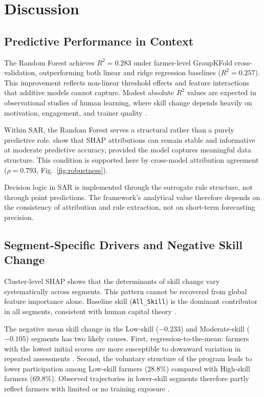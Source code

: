 \documentclass[3p,twocolumn,authoryear]{elsarticle}
\begin{document}
\section{Discussion}

\subsection{Predictive Performance in Context}

The Random Forest achieves $R^{2} = 0.283$ under farmer-level GroupKFold
cross-validation, outperforming both linear and ridge regression baselines
($R^{2} = 0.257$).
This improvement reflects non-linear threshold effects and feature
interactions that additive models cannot capture.
Modest absolute $R^{2}$ values are expected in observational studies of
human learning, where skill change depends heavily on motivation,
engagement, and trainer quality \citep{davis2012}.

Within SAR, the Random Forest serves a structural rather than a purely
predictive role.
\citet{lundberg2020} show that SHAP attributions can remain stable and
informative at moderate predictive accuracy, provided the model captures
meaningful data structure.
This condition is supported here by cross-model attribution agreement
($\rho = 0.793$, Fig.~\ref{fig:robustness}).

Decision logic in SAR is implemented through the surrogate rule structure,
not through point predictions.
The framework's analytical value therefore depends on the consistency of
attribution and rule extraction, not on short-term forecasting precision.

\subsection{Segment-Specific Drivers and Negative Skill Change}

Cluster-level SHAP shows that the determinants of skill change vary
systematically across segments.
This pattern cannot be recovered from global feature importance alone.
Baseline skill (\texttt{All\_Skill}) is the dominant contributor in all
segments, consistent with human capital theory \citep{feder1985,davis2012}.

The negative mean skill change in the Low-skill ($-0.233$) and
Moderate-skill ($-0.105$) segments has two likely causes.
First, regression-to-the-mean: farmers with the lowest initial scores are
more susceptible to downward variation in repeated assessments
\citep{davis2012}.
Second, the voluntary structure of the program leads to lower
participation among Low-skill farmers (28.8\%) compared with High-skill
farmers (69.8\%).
Observed trajectories in lower-skill segments therefore partly reflect
farmers with limited or no training exposure \citep{anderson2004}.
\end{document}
